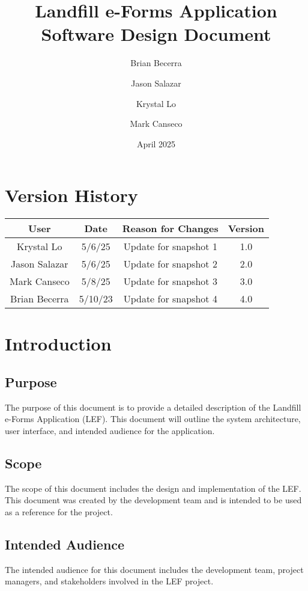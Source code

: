 \documentclass[12pt]{article}
\title{Landfill e-Forms Application\\
Software Design Document}
\author{
    Brian Becerra\\
    \and
    Jason Salazar\\
    \and
    Krystal Lo\\
    \and
    Mark Canseco\\
    }
\date{April 2025}
\begin{document}
\begin{titlepage}
\maketitle
\thispagestyle{empty}
\end{titlepage}

\thispagestyle{empty}
\tableofcontents
\newpage

\section*{Version History}
\begin{table}[ht]
    \centering
    \begin{tabular}{|c|c|c|c|}
    \hline
    \textbf{User} & \textbf{Date} & \textbf{Reason for Changes} & \textbf{Version}\\
    \hline
         Krystal Lo &  5/6/25 &  Update for snapshot 1 & 1.0 \\
    \hline
         Jason Salazar & 5/6/25 & Update for snapshot 2 & 2.0\\
    \hline
         Mark Canseco & 5/8/25 & Update for snapshot 3 & 3.0\\
    \hline
         Brian Becerra& 5/10/23  & Update for snapshot 4 & 4.0\\
    \hline
    \end{tabular}
\end{table}
\newpage

\section{Introduction}
\subsection{Purpose}
The purpose of this document is to provide a detailed description of the Landfill e-Forms Application (LEF). This document will outline the system architecture, user interface, and intended audience for the application.
\subsection{Scope}
The scope of this document includes the design and implementation of the LEF. This document was created by the development team and is intended to be used as a reference for the project.
\subsection{Intended Audience}
The intended audience for this document includes the development team, project managers, and stakeholders involved in the LEF project. 
\end{document}
